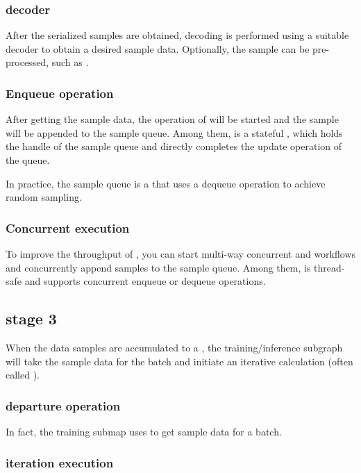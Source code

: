 \begin{content}
\subsubsection{decoder}

After the serialized samples are obtained, decoding is performed using a suitable decoder to obtain a desired sample data. Optionally, the sample can be pre-processed, such as .

\subsubsection{Enqueue operation}

After getting the sample data, the operation of  will be started and the sample will be appended to the sample queue. Among them,  is a stateful , which holds the handle of the sample queue and directly completes the update operation of the queue.

In practice, the sample queue is a  that uses a dequeue operation to achieve random sampling.

\subsubsection{Concurrent execution}

To improve the throughput of , you can start multi-way concurrent  and  workflows and concurrently append samples to the sample queue. Among them,  is thread-safe and supports concurrent enqueue or dequeue operations.

\subsection{stage 3}

When the data samples are accumulated to a , the training/inference subgraph will take the sample data for the batch and initiate an iterative calculation (often called ).

\subsubsection{departure operation}

In fact, the training submap uses  to get sample data for a batch.

\subsubsection{iteration execution}


\end{content}

